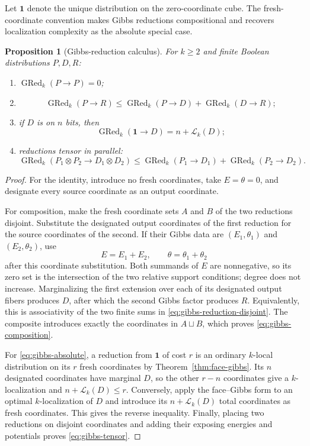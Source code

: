 \documentclass{article}
\newcommand{\LC}{\mathcal{L}}
\newcommand{\GRed}{\operatorname{GRed}}
\newtheorem{proposition}{Proposition}
\begin{document}
Let $\mathbf 1$ denote the unique distribution on the zero-coordinate cube.
The fresh-coordinate convention makes Gibbs reductions compositional and
recovers localization complexity as the absolute special case.

\begin{proposition}[Gibbs-reduction calculus]
\label{prop:gibbs-reduction-calculus}
For $k\ge2$ and finite Boolean distributions $P,D,R$:
\begin{enumerate}
  \item $\GRed_k(P\mathbin{\to}P)=0$;
  \item
  \[
    \GRed_k(P\mathbin{\to}R)
    \le
    \GRed_k(P\mathbin{\to}D)
    +\GRed_k(D\mathbin{\to}R);
    \tag{Comp}\label{eq:gibbs-composition}
  \]
  \item if $D$ is on $n$ bits, then
  \[
    \GRed_k(\mathbf 1\mathbin{\to}D)=n+\LC_k(D);
    \tag{Abs}\label{eq:gibbs-absolute}
  \]
  \item reductions tensor in parallel:
  \[
    \GRed_k(P_1\otimes P_2\mathbin{\to}D_1\otimes D_2)
    \le
    \GRed_k(P_1\mathbin{\to}D_1)
    +\GRed_k(P_2\mathbin{\to}D_2).
    \tag{Ten}\label{eq:gibbs-tensor}
  \]
\end{enumerate}
\end{proposition}

\begin{proof}
For the identity, introduce no fresh coordinates, take $E=\theta=0$, and
designate every source coordinate as an output coordinate.

For composition, make the fresh coordinate sets $A$ and $B$ of the two
reductions disjoint.  Substitute the designated output coordinates of the
first reduction for the source coordinates of the second.  If their Gibbs
data are $(E_1,\theta_1)$ and $(E_2,\theta_2)$, use
\[
  E=E_1+E_2,
  \qquad
  \theta=\theta_1+\theta_2
\]
after this coordinate substitution.  Both summands of $E$ are nonnegative,
so its zero set is the intersection of the two relative support conditions;
degree does not increase.  Marginalizing the first extension over each of its
designated output fibers produces $D$, after which the second Gibbs factor
produces $R$.  Equivalently, this is associativity of the two finite sums in
\eqref{eq:gibbs-reduction-disjoint}.  The composite introduces exactly the
coordinates in $A\sqcup B$, which proves
\eqref{eq:gibbs-composition}.

For \eqref{eq:gibbs-absolute}, a reduction from $\mathbf 1$ of cost $r$ is an
ordinary $k$-local distribution on its $r$ fresh coordinates by
Theorem~\ref{thm:face-gibbs}.  Its $n$ designated coordinates have marginal
$D$, so the other $r-n$ coordinates give a $k$-localization and
$n+\LC_k(D)\le r$.  Conversely, apply the face--Gibbs form to an optimal
$k$-localization of $D$ and introduce its $n+\LC_k(D)$ total coordinates as
fresh coordinates.  This gives the reverse inequality.  Finally, placing two
reductions on disjoint coordinates and adding their exposing energies and
potentials proves \eqref{eq:gibbs-tensor}.
\end{proof}
\end{document}
